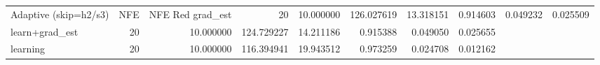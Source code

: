 \begin{tabular}{lrrrrrrr}
\toprule
Adaptive (skip=h2/s3) & NFE & NFE Red %
\midrule
grad_est & 20 & 10.000000 & 126.027619 & 13.318151 & 0.914603 & 0.049232 & 0.025509 \\
learn+grad_est & 20 & 10.000000 & 124.729227 & 14.211186 & 0.915388 & 0.049050 & 0.025655 \\
learning & 20 & 10.000000 & 116.394941 & 19.943512 & 0.973259 & 0.024708 & 0.012162 \\
\bottomrule
\end{tabular}
